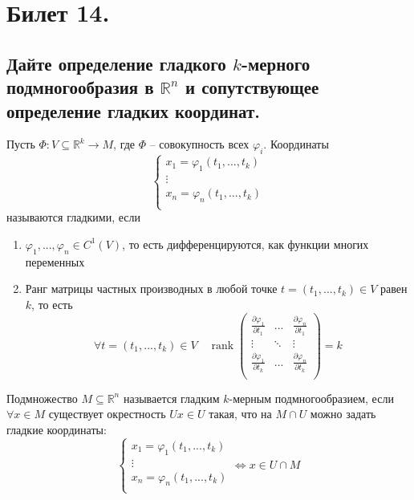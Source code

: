 \section{Билет 14.}

\subsection{Дайте определение гладкого $k$-мерного подмногообразия в $\mathbb{R}^n$ и сопутствующее определение гладких координат.}
\begin{definition}
    Пусть $\Phi : V \subseteq \mathbb{R}^k \to M$, где $\Phi$ -- совокупность всех $\varphi_i$. Координаты
    \[
        \begin{cases}
            x_1 = \varphi_1(t_1, ..., t_k) \\
            \vdots \\
            x_n = \varphi_n(t_1, ..., t_k) \\
        \end{cases}
    \]
    называются гладкими, если
    \begin{enumerate}
        \item $\varphi_1, ..., \varphi_n \in C^{1}(V)$, то есть дифференцируются, как функции многих переменных
        \item Ранг матрицы частных производных в любой точке $t = (t_1, ..., t_k) \in V$ равен $k$, то есть
        \[
            \forall t = (t_1, ..., t_k) \in V
            \quad
            \operatorname{rank} \begin{pmatrix}
                \frac{\partial \varphi_1}{\partial t_1}
                & ... &
                \frac{\partial \varphi_n}{\partial t_1} \\
                \vdots
                & \ddots &
                \vdots \\
                \frac{\partial \varphi_1}{\partial t_k}
                & ... &
                \frac{\partial \varphi_n}{\partial t_k} \\
            \end{pmatrix}
            = k
        \]
    \end{enumerate}
\end{definition}
\begin{definition}
    Подмножество $M \subseteq \mathbb{R}^n$ называется гладким $k$-мерным подмногообразием, если $\forall x \in M$ существует окрестность $U x \in U$ такая, что на $M \cap U$ можно задать гладкие координаты:
    \[
        \begin{cases}
            x_1 = \varphi_1(t_1, ..., t_k) \\
            \vdots \\
            x_n = \varphi_n(t_1, ..., t_k) \\
        \end{cases}
        \Leftrightarrow
        x \in U \cap M
    \]
\end{definition}

